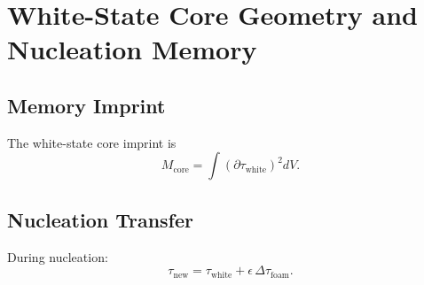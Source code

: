 \chapter{White-State Core Geometry and Nucleation Memory}

\section{Memory Imprint}
The white-state core imprint is
\[
M_{\mathrm{core}} = \int (\partial\tau_{\mathrm{white}})^2 dV.
\]

\section{Nucleation Transfer}
During nucleation:
\[
\tau_{\mathrm{new}} = \tau_{\mathrm{white}} + \epsilon\,\Delta\tau_{\mathrm{foam}}.
\]

